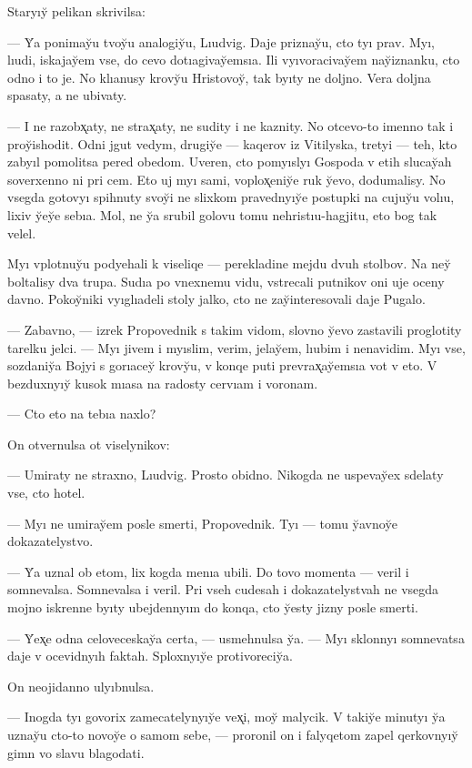 \documentclass[10pt]{book}
\begin{document}
Staryıy̆ pelikan skrivilsa:

— Y̆a ponimay̆u tvoy̆u analogiy̆u, Lıudvig. Daje priznay̆u, cto tyı prav. Myı, lıudi, iskajay̆em vse, do cevo dotıagivay̆emsıa. Ili vyıvoracivay̆em nay̆iznanku, cto odno i to je. No klıanusy krovy̆u Hristovoy̆, tak byıty ne doljno. Vera doljna spasaty, a ne ubivaty.

— I ne razobx̨aty, ne strax̨aty, ne sudity i ne kaznity. No otcevo-to imenno tak i proy̆ishodit. Odni jgut vedym, drugiy̆e — kaqerov iz Vitilyska, tretyi — teh, kto zabyıl pomolitsa pered obedom. Uveren, cto pomyıslyı Gospoda v etih slucay̆ah soverxenno ni pri cem. Eto uj myı sami, voplox̨eniy̆e ruk y̆evo, dodumalisy. No vsegda gotovyı spihnuty svoy̆i ne slixkom pravednyıy̆e postupki na cujuy̆u volıu, lixiv y̆ey̆e sebıa. Mol, ne y̆a srubil golovu tomu nehristıu-hagjitu, eto bog tak velel.

Myı vplotnuy̆u podyehali k viseliqe — perekladine mejdu dvuh stolbov. Na ney̆ boltalisy dva trupa. Sudıa po vnexnemu vidu, vstrecali putnikov oni uje oceny davno. Pokoy̆niki vyıglıadeli stoly jalko, cto ne zay̆interesovali daje Pugalo.

— Zabavno, — izrek Propovednik s takim vidom, slovno y̆evo zastavili proglotity tarelku jelci. — Myı jivem i myıslim, verim, jelay̆em, lıubim i nenavidim. Myı vse, sozdaniy̆a Bojyi s gorıacey̆ krovy̆u, v konqe puti prevrax̨ay̆emsıa vot v eto. V bezduxnyıy̆ kusok mıasa na radosty cervıam i voronam.

— Cto eto na tebıa naxlo?

On otvernulsa ot viselynikov:

— Umiraty ne straxno, Lıudvig. Prosto obidno. Nikogda ne uspevay̆ex sdelaty vse, cto hotel.

— Myı ne umiray̆em posle smerti, Propovednik. Tyı — tomu y̆avnoy̆e dokazatelystvo.

— Y̆a uznal ob etom, lix kogda menıa ubili. Do tovo momenta — veril i somnevalsa. Somnevalsa i veril. Pri vseh cudesah i dokazatelystvah ne vsegda mojno iskrenne byıty ubejdennyım do konqa, cto y̆esty jizny posle smerti.

— Y̆ex̨e odna celoveceskay̆a certa, — usmehnulsa y̆a. — Myı sklonnyı somnevatsa daje v ocevidnyıh faktah. Sploxnyıy̆e protivoreciy̆a.

On neojidanno ulyıbnulsa.

— Inogda tyı govorix zamecatelynyıy̆e vex̨i, moy̆ malycik. V takiy̆e minutyı y̆a uznay̆u cto-to novoy̆e o samom sebe, — proronil on i falyqetom zapel qerkovnyıy̆ gimn vo slavu blagodati.
\end{document}

